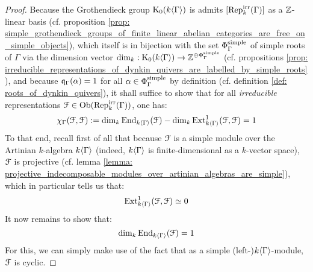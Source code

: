                \begin{proof}
                    Because the Grothendieck group $\mathrm{K}_0(k\langle\Gamma\rangle)$ is admits $[\mathrm{Rep}_k^{\mathrm{irr}}(\Gamma)]$ as a $\mathbb{Z}$-linear basis (cf. proposition \ref{prop: simple_grothendieck_groups_of_finite_linear_abelian_categories_are_free_on_simple_objects}), which itself is in bijection with the set $\Phi_{\Gamma}^{\mathrm{simple}}$ of simple roots of $\Gamma$ via the dimension vector $\dim_k: \mathrm{K}_0(k\langle\Gamma\rangle) \to \mathbb{Z}^{\oplus \Phi_{\Gamma}^{\mathrm{simple}}}$ (cf. propositions \ref{prop: irreducible_representations_of_dynkin_quivers_are_labelled_by_simple_roots}), and because $\mathfrak{q}_{\Gamma}(\alpha) = 1$ for all $\alpha \in \Phi_{\Gamma}^{\mathrm{simple}}$ by definition (cf. definition \ref{def: roots_of_dynkin_quivers}), it shall suffice to show that for all \textit{irreducible} representations $\mathcal{F} \in \mathrm{Ob}(\mathrm{Rep}_k^{\mathrm{irr}}(\Gamma))$, one has:
                        $$\chi_{\Gamma}(\mathcal{F}, \mathcal{F}) := \dim_k \mathrm{End}_{k\langle\Gamma\rangle}(\mathcal{F}) - \dim_k \mathrm{Ext}^1_{k\langle\Gamma\rangle}(\mathcal{F}, \mathcal{F}) = 1$$
                    To that end, recall first of all that because $\mathcal{F}$ is a simple module over the Artinian $k$-algebra $k\langle\Gamma\rangle$ (indeed, $k\langle\Gamma\rangle$ is finite-dimensional as a $k$-vector space), $\mathcal{F}$ is projective (cf. lemma \ref{lemma: projective_indecomposable_modules_over_artinian_algebras_are_simple}), which in particular tells us that:
                        $$\mathrm{Ext}^1_{k\langle\Gamma\rangle}(\mathcal{F}, \mathcal{F}) \simeq 0$$
                    It now remains to show that:
                        $$\dim_k \mathrm{End}_{k\langle\Gamma\rangle}(\mathcal{F}) = 1$$
                    For this, we can simply make use of the fact that as a simple (left-)$k\langle\Gamma\rangle$-module, $\mathcal{F}$ is cyclic.
                \end{proof}
                
